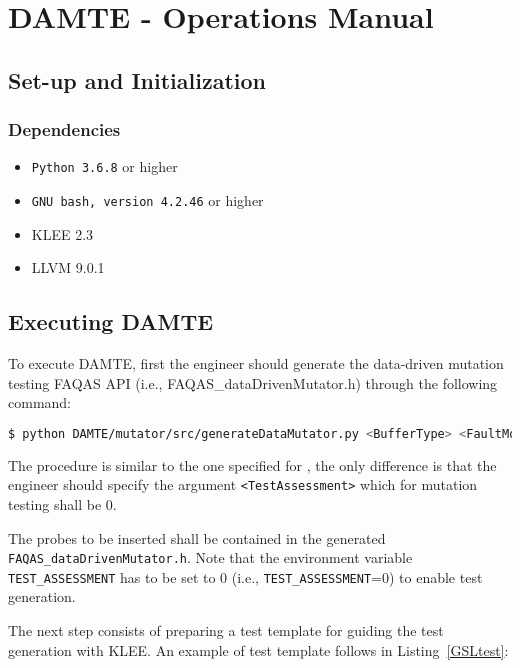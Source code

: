 
\chapter{DAMTE - Operations Manual}
\label{chapter:damte:operations}

\section{Set-up and Initialization}
\label{sec:damte_setup}
\subsection{Dependencies}

\begin{itemize}
	\item \texttt{Python 3.6.8} or higher
	\item \texttt{GNU bash, version 4.2.46} or higher
	\item KLEE 2.3
	\item LLVM 9.0.1
\end{itemize}

\section{Executing DAMTE}

To execute DAMTE, first the engineer should generate the data-driven mutation testing FAQAS API (i.e., FAQAS\_dataDrivenMutator.h) through the following command:

\begin{lstlisting}[language=bash]
 $ python DAMTE/mutator/src/generateDataMutator.py <BufferType> <FaultModel.csv> <TestAssessment> 
\end{lstlisting}

The procedure is similar to the one specified for \DAMA, the only difference is that the engineer should specify the argument \texttt{<TestAssessment>} which for mutation testing shall be $0$.

The probes to be inserted shall be contained in the generated \texttt{FAQAS\_dataDrivenMutator.h}. Note that the environment variable \texttt{TEST\_ASSESSMENT} has to be set to 0 (i.e., \texttt{TEST\_ASSESSMENT}=0) to enable test generation.

The next step consists of preparing a test template for guiding the test generation with KLEE. An example of test template follows in Listing~\ref{GSLtest}:

